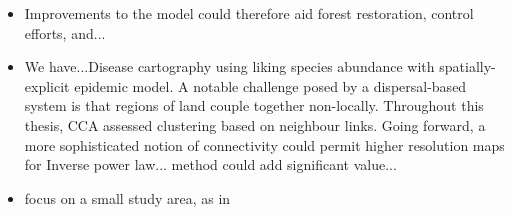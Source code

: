 \begin{itemize}
    \item Improvements to the model could therefore aid forest restoration, control efforts, and...
    \item We have...Disease cartography using liking species abundance with spatially-explicit epidemic model. A notable challenge posed by a dispersal-based system
    is that regions of land couple together non-locally. Throughout this thesis, CCA assessed clustering based on neighbour links. 
    Going forward, a more sophisticated notion of connectivity could permit higher resolution maps for Inverse power law... method could add significant value... 
    \item focus on a small study area, as in \cite{he2019integrating}
\end{itemize}